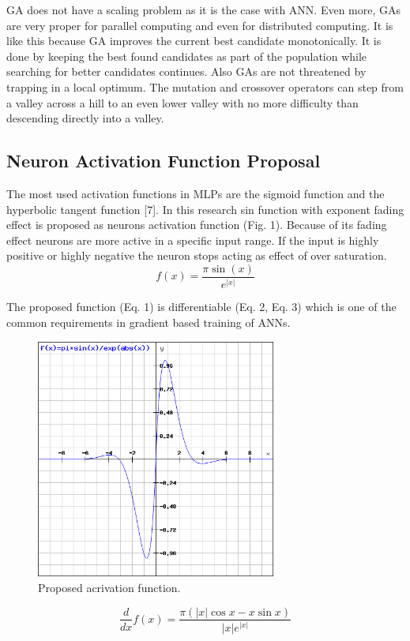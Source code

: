 \documentclass{llncs}
\begin{document}
GA does not have a scaling problem as it is the case with ANN. Even more, GAs are very proper for parallel computing and even for distributed computing. It is like this because GA improves the current best candidate monotonically. It is done by keeping the best found candidates as part of the population while searching for better candidates continues. Also GAs are not threatened by trapping in a local optimum. The mutation and crossover operators can step from a valley across a hill to an even lower valley with no more difficulty than descending directly into a valley.
%
\subsection{Neuron Activation Function Proposal}
%
The most used activation functions in MLPs are the sigmoid function and the hyperbolic tangent function [7]. In this research sin function with exponent fading effect is proposed as neurons activation function (Fig. 1). Because of its fading effect neurons are more active in a specific input range. If the input is highly positive or highly negative the neuron stops acting as effect of over saturation.
%
\begin{equation}
f(x) = \frac {\pi \sin(x)} { e^{ |x| }}
\end{equation}

The proposed function (Eq. 1) is differentiable (Eq. 2, Eq. 3) which is one of the common requirements in gradient based training of ANNs.
%
\begin{figure}
	\centering
	\includegraphics[width=7.88cm,height=7.88cm]{fig03.png}
	\caption{Proposed acrivation function.}
	\label{fig:Graph}
\end{figure}
\FloatBarrier
%
\begin{equation}
\frac{d}{dx}f(x) = \frac {\pi (|x|\cos x - x\sin x)} { |x| e^{ |x| } }
\end{equation}
\end{document}
